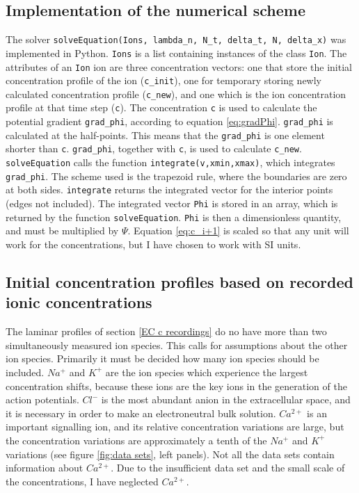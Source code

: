 \documentclass{article}
\begin{document}
\subsection{Implementation of the numerical scheme}
The solver \texttt{solveEquation(Ions, lambda\_n, N\_t, delta\_t, N, delta\_x)} was implemented in Python.  \texttt{Ions} is a list containing instances of the class \texttt{Ion}. The attributes of an \texttt{Ion} ion are three concentration vectors: one that store the initial concentration profile of the ion (\texttt{c\_{init}}), one for temporary storing newly calculated concentration profile (\texttt{c\_{new}}), and one which is the ion concentration profile at that time step (\texttt{c}). The concentration \texttt{c} is used to calculate the potential gradient \texttt{grad\_phi}, according to equation \ref{eq:gradPhi}. \texttt{grad\_phi} is calculated at the half-points. This means that the \texttt{grad\_phi} is one element shorter than \texttt{c}. \texttt{grad\_{phi}}, together with \texttt{c}, is used to calculate \texttt{c\_new}. \texttt{solveEquation} calls the function \texttt{integrate(v,xmin,xmax)}, which integrates \texttt{grad\_phi}. The scheme used is the trapezoid rule, where the boundaries are zero at both sides. \texttt{integrate} returns the integrated vector for the interior points (edges not included). The integrated vector \texttt{Phi} is stored in an array, which is returned by the function \texttt{solveEquation}. \texttt{Phi} is then a dimensionless quantity, and must be multiplied by $\Psi$. Equation \ref{eq:c_i+1} is scaled so that any unit will work for the concentrations, but I have chosen to work with SI units. 

\subsection{Initial concentration profiles based on recorded ionic concentrations}\label{Initial concentration profiles}
The laminar profiles of section \ref{EC c recordings} do no have more than two simultaneously measured ion species. This calls for assumptions about the other ion species. Primarily it must be decided how many ion species should be included. $Na^+$ and $K^+$ are the ion species which experience the largest concentration shifts, because these ions are the key ions in the generation of the action potentials. $Cl^-$ is the most abundant anion in the extracellular space, and it is necessary in order to make an electroneutral bulk solution. $Ca^{2+}$ is an important signalling ion, and its relative concentration variations are large, but the concentration variations are approximately a tenth of the $Na^+$ and $K^+$ variations (see figure \ref{fig:data sets}, left panels). Not all the data sets contain information about $Ca^{2+}$. Due to the insufficient data set and the small scale of the concentrations, I have neglected $Ca^{2+}$.  
\end{document}
